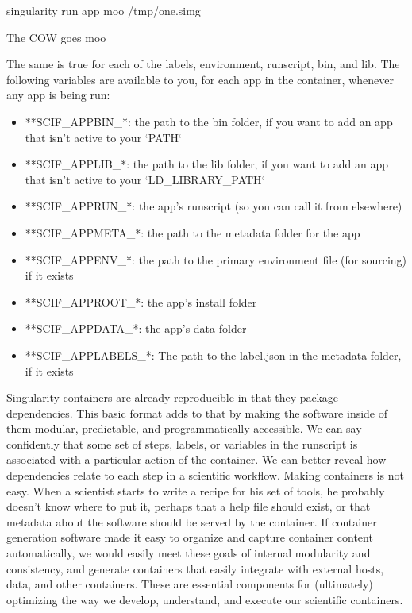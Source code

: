 \documentclass[letterpaper,10pt,english]{sphinxmanual}
\begin{document}
%
\begin{sphinxVerbatim}[commandchars=\\\{\}]
\PYGZdl{} singularity run \PYGZhy{}\PYGZhy{}app moo /tmp/one.simg

The COW goes moo
\end{sphinxVerbatim}

The same is true for each of the labels, environment, runscript, bin,
and lib. The following variables are available to you, for each app in
the container, whenever any app is being run:
\begin{itemize}
\item {} 
**SCIF\_APPBIN\_*: the path to the bin folder, if you want to add
an app that isn’t active to your ‘PATH‘

\item {} 
**SCIF\_APPLIB\_*: the path to the lib folder, if you want to add
an app that isn’t active to your ‘LD\_LIBRARY\_PATH‘

\item {} 
**SCIF\_APPRUN\_*: the app’s runscript (so you can call it from
elsewhere)

\item {} 
**SCIF\_APPMETA\_*: the path to the metadata folder for the app

\item {} 
**SCIF\_APPENV\_*: the path to the primary environment file (for
sourcing) if it exists

\item {} 
**SCIF\_APPROOT\_*: the app’s install folder

\item {} 
**SCIF\_APPDATA\_*: the app’s data folder

\item {} 
**SCIF\_APPLABELS\_*: The path to the label.json in the metadata
folder, if it exists

\end{itemize}

Singularity containers are already reproducible in that they package
dependencies. This basic format adds to that by making the software
inside of them modular, predictable, and programmatically accessible. We
can say confidently that some set of steps, labels, or variables in the
runscript is associated with a particular action of the container. We
can better reveal how dependencies relate to each step in a scientific
workflow. Making containers is not easy. When a scientist starts to
write a recipe for his set of tools, he probably doesn’t know where to
put it, perhaps that a help file should exist, or that metadata about
the software should be served by the container. If container generation
software made it easy to organize and capture container content
automatically, we would easily meet these goals of internal modularity
and consistency, and generate containers that easily integrate with
external hosts, data, and other containers. These are essential
components for (ultimately) optimizing the way we develop, understand,
and execute our scientific containers.
\end{document}
